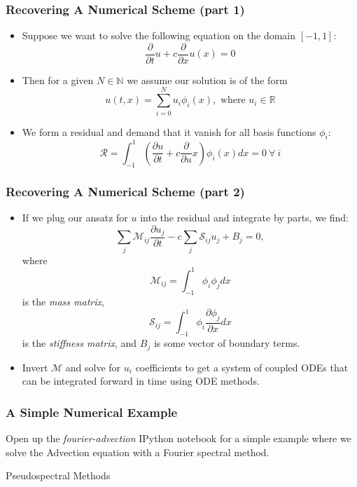 \documentclass[]{beamer}
\newcommand{\R}{\mathbb{R}}
\newcommand{\N}{\mathbb{N}}
\newcommand{\pd}[2]{\frac{\partial #1}{\partial #2}}
\newcommand{\pdd}[1]{\frac{\partial}{\partial #1}}
\begin{document}
\begin{frame}
  \frametitle{Recovering A Numerical Scheme (part 1)}
  \begin{itemize}
    \item Suppose we want to solve the following equation on the domain $[-1,1]$:
      $$\pdd{t}u+c\pdd{x} u(x) = 0$$
      \pause
    \item Then for a given $N\in\N$ we assume our solution is of the form
      $$u(t,x)=\sum_{i=0}^N u_i \phi_i(x),\text{ where }u_i \in\R$$
      \pause
    \item We form a residual and demand that it vanish for all basis functions $\phi_i$:
      $$\mathcal{R} = \int_{-1}^1 \left(\pd{u}{t} + c\pdd{u}{x}\right)\phi_i(x)dx=0\ \forall\ i$$
  \end{itemize}
\end{frame}

\begin{frame}
  \frametitle{Recovering A Numerical Scheme (part 2)}
  \begin{itemize}
  \item If we plug our ansatz for $u$ into the residual and integrate by parts, we find:
    $$\sum_{j}\mathcal{M}_{ij}\pd{u_j}{t} - c \sum_{j}\mathcal{S}_{ij}u_j + B_j =0,$$
    where
    $$\mathcal{M}_{ij} = \int_{-1}^1\phi_i\phi_j dx$$
    is the \textit{mass matrix},
    $$\mathcal{S}_{ij} = \int_{-1}^1\phi_i\pd{\phi_j}{x}dx$$
    is the \textit{stiffness matrix}, and $B_j$ is some vector of
    boundary terms.
    \pause
  \item Invert $\mathcal{M}$ and solve for $u_i$ coefficients to get a
    system of coupled ODEs that can be integrated forward in time
    using ODE methods.
  \end{itemize}
\end{frame}

\begin{frame}
  \frametitle{A Simple Numerical Example}
  \begin{center}
    \begin{huge}
      Open up the \textit{fourier-advection} IPython notebook for a
      simple example where we solve the Advection equation with a
      Fourier spectral method.
    \end{huge}
  \end{center}
\end{frame}

\begin{frame}[plain]
  \begin{center}
    {\huge Pseudospectral Methods}
  \end{center}
\end{frame}
\end{document}
